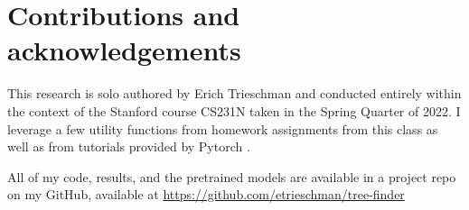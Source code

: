 \documentclass[10pt,twocolumn,letterpaper]{article}
\begin{document}
\section{Contributions and acknowledgements}
\label{sec:contrib}
This research is solo authored by Erich Trieschman and conducted entirely within the context of the Stanford course CS231N taken in the Spring Quarter of 2022. I leverage a few utility functions from homework assignments from this class as well as from tutorials provided by Pytorch \cite{PyTorch}.

All of my code, results, and the pretrained models are available in a project repo on my GitHub, available at \url{https://github.com/etrieschman/tree-finder}

{\small


}
\end{document}
